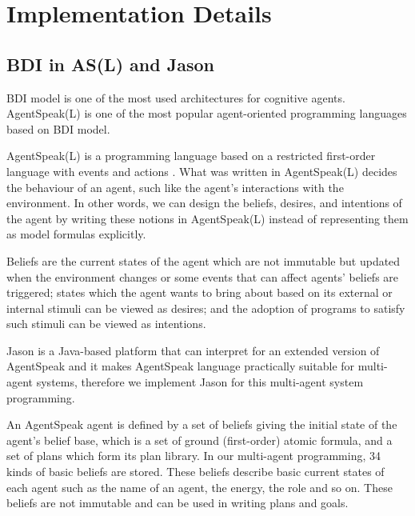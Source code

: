 
\section{Implementation Details}
\subsection{BDI in AS(L) and Jason}

BDI model is one of the most used architectures for cognitive agents. AgentSpeak(L) is one of the most popular agent-oriented programming languages based on BDI model.

AgentSpeak(L) is a programming language based on a restricted first-order language with events and actions \cite{anand_AgentSpeak_1996}. What was written in AgentSpeak(L) decides the behaviour of an agent, such like the agent's interactions with the environment. In other words, we can design the beliefs, desires, and intentions of the agent by writing these notions in AgentSpeak(L) instead of representing them as model formulas explicitly.

Beliefs are the current states of the agent which are not immutable but updated when the environment changes or some events that can affect agents' beliefs are triggered; states which the agent wants to bring about based on its external or internal stimuli can be viewed as desires; and the adoption of programs to satisfy such stimuli can be viewed as intentions\cite{anand_AgentSpeak_1996}. 

Jason is a Java-based platform that can interpret for an extended version of AgentSpeak and it makes AgentSpeak language practically suitable for multi-agent systems, therefore we implement Jason for this multi-agent system programming. 

An AgentSpeak agent is defined by a set of beliefs giving the initial state of the agent’s belief base, which is a set of ground (first-order) atomic formula, and a set of plans which form its plan library\cite{rafael_BDIAgent_2005}. In our multi-agent programming, 34 kinds of basic beliefs are stored. These beliefs describe basic current states of each agent such as the name of an agent, the energy, the role and so on. These beliefs are not immutable and can be used in writing plans and goals. 

